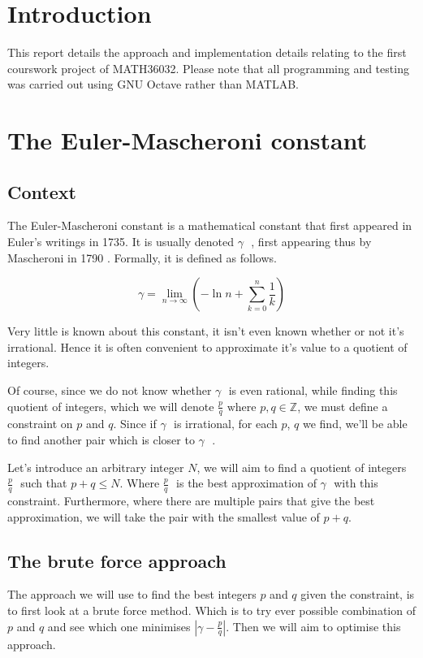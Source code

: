 \documentclass[10pt]{report}
\newcommand*{\gam}{$\gamma \text{ }$}
\newcommand*{\pdivq}{$\frac{p}{q} \text{ }$}
\begin{document}
\section{Introduction}

This report details the approach and implementation details relating to the first courswork project of MATH36032. Please note that all programming and testing was carried out using GNU Octave rather than MATLAB.
\section{The Euler-Mascheroni constant}

\subsection{Context}
The Euler-Mascheroni constant is a mathematical constant that first appeared in Euler's writings in 1735. It is usually denoted \gam, first appearing thus by Mascheroni in 1790 \cite{eulerconst}. Formally, it is defined as follows.

\begin{equation}
\gamma = \lim_{n \to \infty}  \left( -\ln{n} + \sum_{k=0}^{n} \frac{1}{k}  \right)
\end{equation}

Very little is known about this constant, it isn't even known whether or not it's irrational. Hence it is often convenient to approximate it's value to a quotient of integers. 

Of course, since we do not know whether \gam is even rational, while finding this quotient of integers, which we will denote $ \frac{p}{q} \text{ where } p,q \in \mathbb{Z}$, we must define a constraint on $p$ and $q$. Since if \gam is irrational, for each $p$, $q$ we find, we'll be able to find another pair which is closer to \gam. 

Let's introduce an arbitrary integer $N$, we will aim to find a quotient of integers \pdivq such that $p + q \leq N$. Where \pdivq is the best approximation of \gam with this constraint. Furthermore, where there are multiple pairs that give the best approximation, we will take the pair with the smallest value of $p+q$.

\subsection{The brute force approach}

The approach we will use to find the best integers $p$ and $q$ given the constraint, is to first look at a brute force method. Which is to try ever possible combination of $p$ and $q$ and see which one minimises $ | \gamma - \frac{p}{q} |$. Then we will aim to optimise this approach.
\end{document}
